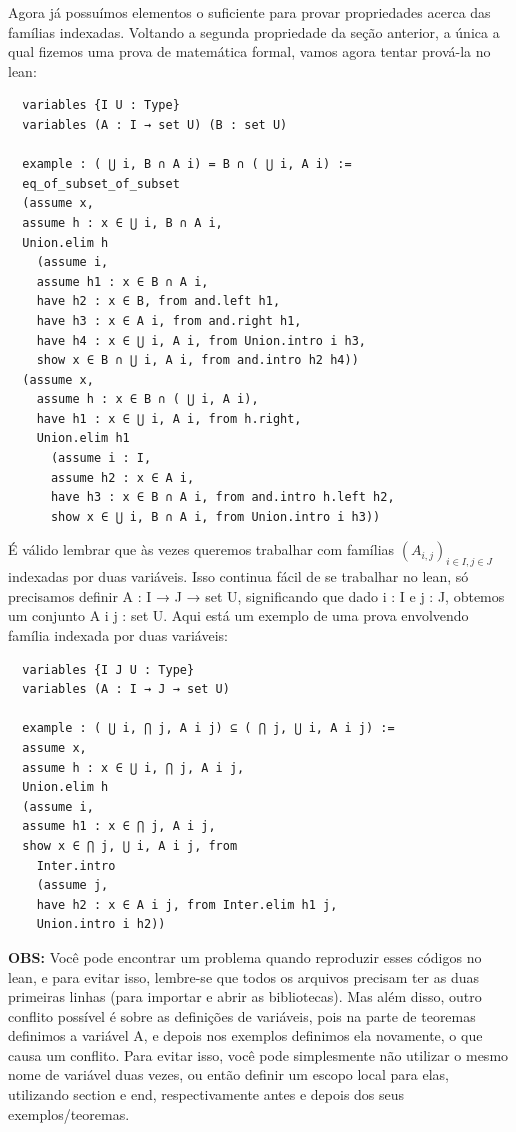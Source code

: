 Agora já possuímos elementos o suficiente para provar propriedades acerca das famílias indexadas. Voltando a segunda propriedade da seção anterior, a única a qual fizemos uma prova de matemática formal, vamos agora tentar prová-la no lean:

\begin{lstlisting}
  variables {I U : Type}
  variables (A : I → set U) (B : set U)

  example : ( ⋃ i, B ∩ A i) = B ∩ ( ⋃ i, A i) :=
  eq_of_subset_of_subset
  (assume x,
  assume h : x ∈ ⋃ i, B ∩ A i,
  Union.elim h
    (assume i,
    assume h1 : x ∈ B ∩ A i,
    have h2 : x ∈ B, from and.left h1,
    have h3 : x ∈ A i, from and.right h1,
    have h4 : x ∈ ⋃ i, A i, from Union.intro i h3,
    show x ∈ B ∩ ⋃ i, A i, from and.intro h2 h4))
  (assume x,
    assume h : x ∈ B ∩ ( ⋃ i, A i),
    have h1 : x ∈ ⋃ i, A i, from h.right,
    Union.elim h1
      (assume i : I,
      assume h2 : x ∈ A i,
      have h3 : x ∈ B ∩ A i, from and.intro h.left h2,
      show x ∈ ⋃ i, B ∩ A i, from Union.intro i h3))
\end{lstlisting}

É válido lembrar que às vezes queremos trabalhar com famílias $(A_{i,j})_{i \in I, j \in J}$ indexadas por duas variáveis. Isso continua fácil de se trabalhar no lean, só precisamos definir {\selectfont A : I → J → set U}, significando que dado {\selectfont i : I} e {\selectfont j : J}, obtemos um conjunto {\selectfont A i j : set U}. Aqui está um exemplo de uma prova envolvendo família indexada por duas variáveis:

\begin{lstlisting}
  variables {I J U : Type}
  variables (A : I → J → set U)

  example : ( ⋃ i, ⋂ j, A i j) ⊆ ( ⋂ j, ⋃ i, A i j) :=
  assume x,
  assume h : x ∈ ⋃ i, ⋂ j, A i j,
  Union.elim h
  (assume i,
  assume h1 : x ∈ ⋂ j, A i j,
  show x ∈ ⋂ j, ⋃ i, A i j, from
    Inter.intro
    (assume j,
    have h2 : x ∈ A i j, from Inter.elim h1 j,
    Union.intro i h2))
\end{lstlisting}

\textbf{OBS:} Você pode encontrar um problema quando reproduzir esses códigos no lean, e para evitar isso, lembre-se que todos os arquivos precisam ter as duas primeiras linhas (para importar e abrir as bibliotecas). Mas além disso, outro conflito possível é sobre as definições de variáveis, pois na parte de teoremas definimos a variável {\selectfont A}, e depois nos exemplos definimos ela novamente, o que causa um conflito. Para evitar isso, você pode simplesmente não utilizar o mesmo nome de variável duas vezes, ou então definir um escopo local para elas, utilizando {\selectfont section} e {\selectfont end}, respectivamente antes e depois dos seus exemplos/teoremas.

